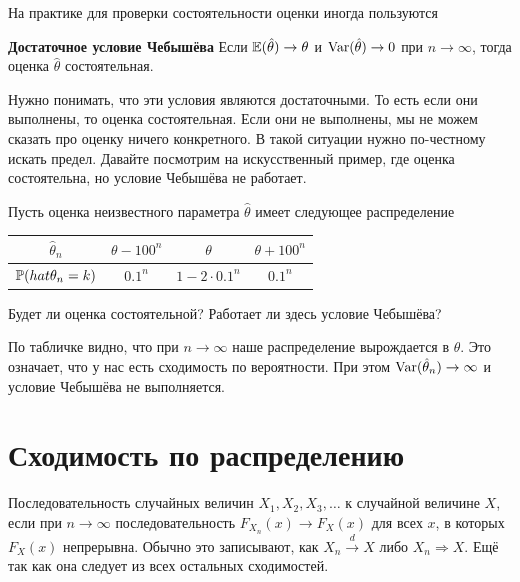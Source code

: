 \documentclass[12pt, a4paper, oneside]{article}
\begin{document}
На практике для проверки состоятельности оценки иногда пользуются  

\begin{theorem}{\textbf{Достаточное условие Чебышёва}}
Если $\mathbb{E}(\hat{\theta}) \to \theta$ и $\operatorname{Var}(\hat{\theta}) \to 0$ при $n \to \infty$, тогда оценка $\hat{\theta}$ состоятельная. 
\end{theorem}

Нужно понимать, что эти условия являются достаточными. То есть если они выполнены, то оценка состоятельная. Если они не выполнены, мы не можем сказать про оценку ничего конкретного. В такой ситуации нужно по-честному искать предел. Давайте посмотрим на искусственный пример, где оценка состоятельна, но условие Чебышёва не работает. 

\begin{problem}{ } 
Пусть оценка неизвестного параметра $\hat \theta$ имеет следующее распределение 

\begin{center}
\begin{tabular}{c|c|c|c}
$\hat{\theta}_n$ & $\theta - 100^n$ & $\theta$ & $\theta + 100^n$  \\
\hline
$\mathbb{P}(hat{\theta}_n = k)$ & $0.1^n$ & $1 - 2 \cdot 0.1^n$ & $0.1^n$ \\
\end{tabular}
\end{center}

Будет ли оценка состоятельной? Работает ли здесь условие Чебышёва? 
\end{problem} 

\begin{sol}
По табличке видно, что при $n \to \infty$ наше распределение вырождается в $\theta$. Это означает, что у нас есть сходимость по вероятности. При этом $\operatorname{Var}(\hat{\theta}_n) \to \infty$ и условие Чебышёва не выполняется. 
\end{sol} 

\section{Сходимость по распределению}

\begin{definition} 
Последовательность случайных величин $X_1, X_2, X_3, \ldots$  к случайной величине $X$, если при $n \to \infty$ последовательность $F_{X_n}(x) \to F_X(x)$ для всех $x$, в которых $F_X(x)$ непрерывна. Обычно это записывают, как $X_n \overset{d}{\to} X$ либо $X_n \Rightarrow X$. Ещё  так как она следует из всех остальных сходимостей. 
\end{definition}
\end{document}
